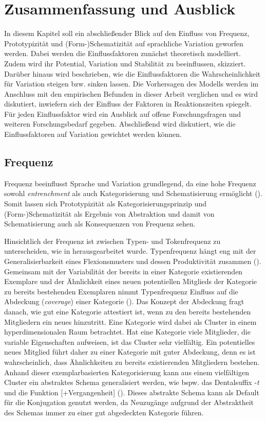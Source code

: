 \chapter{Zusammenfassung und Ausblick}\label{fazit}

In diesem Kapitel soll ein abschließender Blick auf den Einfluss von Frequenz, Prototypizität und (Form-)Schematizität auf sprachliche Variation geworfen werden. Dabei werden die Einflussfaktoren zunächst theoretisch modelliert. Zudem wird ihr Potential, Variation und Stabilität zu beeinflussen, skizziert. Darüber hinaus wird beschrieben, wie die Einflussfaktoren die Wahrscheinlichkeit für Variation steigen bzw. sinken lassen. Die Vorhersagen des Modells werden im Anschluss mit den empirischen Befunden in dieser Arbeit verglichen und es wird diskutiert, inwiefern sich der Einfluss der Faktoren in Reaktionszeiten spiegelt. Für jeden Einflussfaktor wird ein Ausblick auf offene Forschungsfragen und weiteren Forschungsbedarf gegeben. Abschließend wird diskutiert, wie die Einflussfaktoren auf Variation gewichtet werden können.

\section{Frequenz}

Frequenz beeinflusst Sprache und Variation grundlegend, da eine hohe Frequenz sowohl \textit{entrenchment} als auch Kategorisierung und Schematisierung ermöglicht (\cite[220]{Langacker.2008}). Somit lassen sich Prototypizität als Kategorisierungsprinzip und \mbox{(Form}-)Sche\-ma\-ti\-zi\-tät als Ergebnis von Abstraktion und damit von Schematisierung auch als Konsequenzen von Frequenz sehen. 

Hinsichtlich der Frequenz ist zwischen Typen- und  Tokenfrequenz zu unterscheiden, wie in  herausgearbeitet wurde. Typenfrequenz hängt eng mit der Generalisierbarkeit eines Flexionsmusters und dessen Produktivität zusammen (\cite[384]{Bybee.1997}). Gemeinsam mit der Variabilität der bereits in einer Kategorie existierenden Exemplare und der Ähnlichkeit eines neuen potentiellen Mitglieds der Kategorie zu bereits bestehenden Exemplaren nimmt Typenfrequenz Einfluss auf die Abdeckung (\textit{coverage}) einer Kategorie (\cite[62--65]{Goldberg.2019}). Das Konzept der Abdeckung fragt danach, wie gut eine Kategorie attestiert ist, wenn zu den bereits bestehenden Mitgliedern ein neues hinzutritt. Eine Kategorie wird dabei als Cluster in einem hyperdimensionalen Raum betrachtet. Hat eine Kategorie viele Mitglieder, die variable Eigenschaften aufweisen, ist das Cluster sehr vielfältig. Ein potentielles neues Mitglied führt daher zu einer Kategorie mit guter Abdeckung, denn es ist wahrscheinlich, dass Ähnlichkeiten zu bereits existierenden Mitgliedern bestehen. Anhand dieser exemplarbasierten Kategorisierung kann aus einem vielfältigen Cluster ein abstraktes Schema generalisiert werden, wie bspw. das Dentalsuffix -\textit{t} und die Funktion [+Vergangenheit] (\cite[136]{Goldberg.2019}). Dieses abstrakte Schema kann als Default für die Konjugation genutzt werden, da Neuzugänge aufgrund der Abstraktheit des Schemas immer zu einer gut abgedeckten Kategorie führen.  


